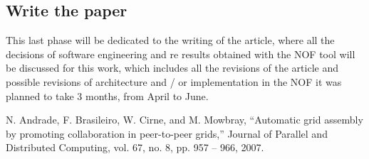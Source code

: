\documentclass{article}
\begin{document}
\subsection{Write the paper}
    This last phase will be dedicated to the writing of the article, where all the decisions of software engineering and re results obtained with the NOF tool will be discussed for this work, which includes all the revisions of the article and possible revisions of architecture and / or implementation in the NOF it was planned to take 3 months, from April to June.

\begin{thebibliography}{9}
N. Andrade, F. Brasileiro, W. Cirne, and M. Mowbray, “Automatic grid
assembly by promoting collaboration in peer-to-peer grids,” Journal of
Parallel and Distributed Computing, vol. 67, no. 8, pp. 957 – 966, 2007.
\end{thebibliography}
    
\end{document}
